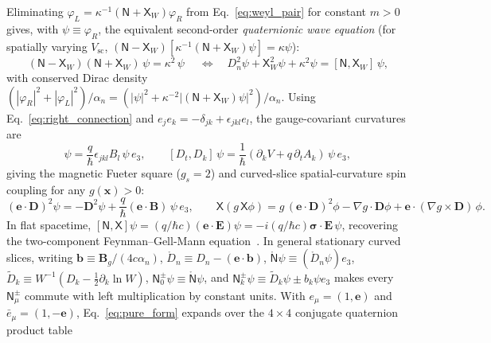 \documentclass[aps,prd,onecolumn,tightenlines,nofootinbib,notitlepage,10pt,floatfix]{revtex4-2}
\theoremstyle{indentedtheorem}
\begin{document}
Eliminating $\varphi_L=\kappa^{-1}(\mathsf{N}+\mathsf{X}_W)\varphi_R$ from Eq.~\eqref{eq:weyl_pair} for constant $m>0$ gives, with $\psi\equiv\varphi_R$, the equivalent second-order \emph{quaternionic wave equation} (for spatially varying $V_\text{sc}$, $(\mathsf{N}-\mathsf{X}_W)[\kappa^{-1}(\mathsf{N}+\mathsf{X}_W)\psi]=\kappa\psi$):
\begin{equation}
    \boxed{\;(\mathsf{N}-\mathsf{X}_W)(\mathsf{N}+\mathsf{X}_W)\,\psi = \kappa^2\,\psi\;} \quad\Longleftrightarrow\quad D_n^2\psi + \mathsf{X}_W^2\psi + \kappa^2\psi = [\mathsf{N},\mathsf{X}_W]\,\psi ,
    \label{eq:pure_form}
\end{equation}
with conserved Dirac density $(|\varphi_R|^2+|\varphi_L|^2)/\alpha_n=(|\psi|^2+\kappa^{-2}|(\mathsf{N}+\mathsf{X}_W)\psi|^2)/\alpha_n$. Using Eq.~\eqref{eq:right_connection} and $e_j e_k=-\delta_{jk}+\epsilon_{jkl}e_l$, the gauge-covariant curvatures are
\begin{equation}
    [D_j,D_k]\,\psi = \frac{q}{\hbar}\epsilon_{jkl}B_l\,\psi\,e_3 , \qquad [D_t,D_k]\,\psi = \frac{1}{\hbar}(\partial_k V+q\,\partial_t A_k)\,\psi\,e_3 ,
    \label{eq:phase_curvature}
\end{equation}
giving the magnetic Fueter square ($g_s=2$) and curved-slice spatial-curvature spin coupling for any $g(\mathbf{x})>0$:
\begin{equation}
    (\mathbf{e}\cdot\mathbf{D})^2\psi = -\mathbf{D}^2\psi + \frac{q}{\hbar}(\mathbf{e}\cdot\mathbf{B})\,\psi\,e_3 , \qquad \mathsf{X}(g\,\mathsf{X}\phi) = g\,(\mathbf{e}\cdot\mathbf{D})^2\phi - \nabla g\cdot\mathbf{D}\phi + \mathbf{e}\cdot(\nabla g\times\mathbf{D})\,\phi .
    \label{eq:fueter_square}
\end{equation}
In flat spacetime, $[\mathsf{N},\mathsf{X}]\psi=(q/\hbar c)(\mathbf{e}\cdot\mathbf{E})\psi=-i(q/\hbar c)\boldsymbol{\sigma}\cdot\mathbf{E}\,\psi$, recovering the two-component Feynman--Gell-Mann equation~\citep{FeynmanGellMann1958Theory}. In general stationary curved slices, writing $\mathbf{b}\equiv\mathbf{B}_g/(4c\alpha_n)$, $\mathring{D}_n\equiv D_n-(\mathbf{e}\cdot\mathbf{b})$, $\mathring{\mathsf{N}}\psi\equiv(\mathring{D}_n\psi)e_3$, $\tilde{D}_k\equiv W^{-1}(D_k-\tfrac{1}{2}\partial_k\ln W)$, $\mathsf{N}_0^\pm\psi\equiv\mathring{\mathsf{N}}\psi$, and $\mathsf{N}_k^\pm\psi\equiv\tilde{D}_k\psi\pm b_k\psi e_3$ makes every $\mathsf{N}_\mu^\pm$ commute with left multiplication by constant units. With $e_\mu=(1,\mathbf{e})$ and $\bar{e}_\mu=(1,-\mathbf{e})$, Eq.~\eqref{eq:pure_form} expands over the $4\times 4$ conjugate quaternion product table
\end{document}
